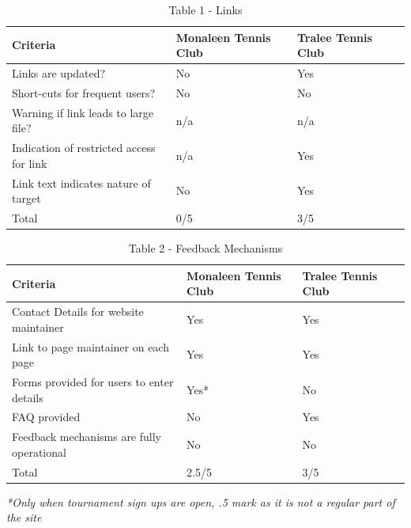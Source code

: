 \begin{table}[H]
\caption{Table 1 - Links}
\begin{center}
    \begin{tabular}{ | l | l | l | p{5cm} |}
    \hline
	\textbf{Criteria} & \textbf{Monaleen Tennis Club} & \textbf{Tralee Tennis Club}\\ \hline
	Links are updated? & No & Yes\\ \hline
	Short-cuts for frequent users? & No & No\\ \hline
	Warning if link leads to large file? & n/a & n/a\\ \hline
	Indication of restricted access for link & n/a & Yes\\ \hline
	Link text indicates nature of target & No & Yes\\ \hline
	Total & 0/5 & 3/5\\ \hline	
    \end{tabular}
\end{center}
\label{fig:table1}
\end{table}

\begin{table}[H]
\caption{Table 2 - Feedback Mechanisms}
\begin{center}
    \begin{tabular}{ | l | l | l | p{5cm} |}
    \hline
	\textbf{Criteria} & \textbf{Monaleen Tennis Club} & \textbf{Tralee Tennis Club}\\ \hline
	Contact Details for website maintainer & Yes & Yes\\ \hline
	Link to page maintainer on each page & Yes & Yes\\ \hline
	Forms provided for users to enter details & Yes* & No\\ \hline
	FAQ provided & No & Yes\\ \hline
	Feedback mechanisms are fully operational & No & No\\ \hline
	Total & 2.5/5 & 3/5\\ \hline	
    \end{tabular}
\end{center}
\label{fig:table2}
\end{table}
\textit{*Only when tournament sign ups are open, .5 mark as it is not a regular part of the site}

